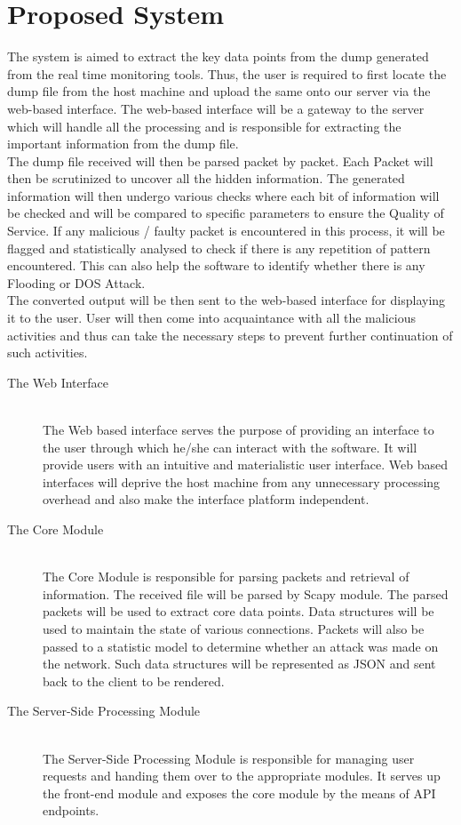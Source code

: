 \chapter{Proposed System}
{
	The system is aimed to extract the key data points from the dump generated from the real time monitoring tools. Thus, the user is required to first locate the dump file from the host machine and upload the same onto our server via the web-based interface. The web-based interface will be a gateway to the server which will handle all the processing and is responsible for extracting the important information from the dump file. \\
	The dump file received will then be parsed packet by packet. Each Packet will then be scrutinized to uncover all the hidden information.  The generated information will then undergo various checks where each bit of information will be checked and will be compared to specific parameters to ensure the Quality of Service. If any malicious / faulty packet is encountered in this process, it will be flagged and statistically analysed to check if there is any repetition of pattern encountered. This can also help the software to identify whether there is any Flooding or DOS Attack. \\
	The converted output will be then sent to the web-based interface for displaying it to the user. User will then come into acquaintance with all the malicious activities and thus can take the necessary steps to prevent further continuation of such activities. 
	\begin{description}
		\item[The Web Interface]\ \\
		{
			The Web based interface serves the purpose of providing an interface to the user through which he/she can interact with the software. It will provide users with an intuitive and materialistic user interface. Web based interfaces will deprive the host machine from any unnecessary processing overhead and also make the interface platform independent.
		}
		\item[The Core Module]\ \\ 
		{
			The Core Module is responsible for parsing packets and retrieval of information. The received file will be parsed by Scapy module. The parsed packets will be used to extract core data points. Data structures will be used to maintain the state of various connections. Packets will also be passed to a statistic model to determine whether an attack was made on the network. Such data structures will be represented as JSON and sent back to the client to be rendered.			
		}
		\item[The Server-Side Processing Module] \ \\
		{
			The Server-Side Processing Module is responsible for managing user requests and handing them over to the appropriate modules. It serves up the front-end module and exposes the core module by the means of API endpoints.
		}
	\end{description}
}